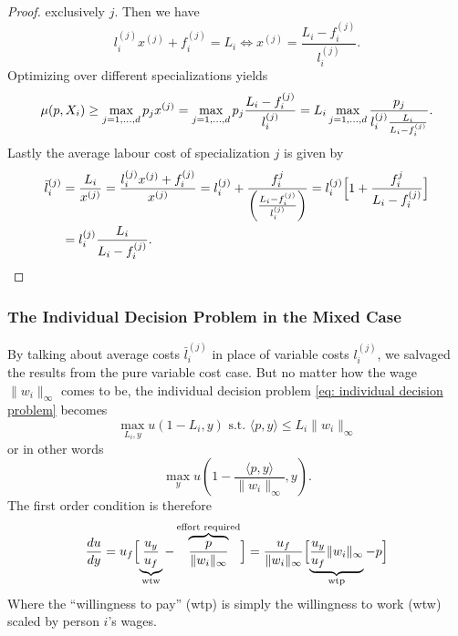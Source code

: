 \begin{proof}
	exclusively \(j\). Then we have
	\[
		l_i^{(j)} x^{(j)} + f_i^{(j)} = L_i \iff x^{(j)}
		= \frac{L_i-f_i^{(j)}}{l_i^{(j)}}.
	\]
	Optimizing over different specializations yields
	\[
		\mu(p, X_i) \ge \max_{j=1,\dots,d} p_j x^{(j)}
		= \max_{j=1,\dots,d}
		p_j \frac{L_i - f_i^{(j)}}{l_i^{(j)}}
		= L_i\max_{j=1,\dots,d}
		\frac{p_j}{l_i^{(j)}\frac{L_i}{L_i - f_i^{(j)}}}.
	\]
	Lastly the average labour cost of specialization \(j\) is given by
	\begin{align*}
		\bar{l}_i^{(j)}
		&= \frac{L_i}{x^{(j)}}
		= \frac{l_i^{(j)} x^{(j)} + f_i^{(j)}}{x^{(j)}}
		= l_i^{(j)} + \frac{f_i^{j}}{\left(\frac{L_i-f_i^{(j)}}{l_i^{(j)}}\right)}
		= l_i^{(j)} \Bigl[1 + \frac{f_i^{j}}{L_i-f_i^{(j)}}\Bigr]\\
		&=l_i^{(j)}\frac{L_i}{L_i - f_i^{(j)}}.
		\qedhere
	\end{align*}
\end{proof}

\subsubsection{The Individual Decision Problem in the Mixed Case}

By talking about average costs \(\bar{l}_i^{(j)}\) in place of variable costs
\(l_i^{(j)}\), we salvaged the results from the pure variable
cost case. But no matter how the wage \(\|w_i\|_\infty\) comes to be, the
individual decision problem \eqref{eq: individual decision problem} becomes
\[
	\max_{L_i, y} u(1-L_i, y) \text{ s.t. } \langle p, y\rangle \le L_i \|w_i\|_\infty
\]
or in other words
\[
	\max_{y} u\left(1- \frac{\langle p, y\rangle}{\|w_i\|_\infty}, y\right).
\]
The first order condition is therefore
\[
	\frac{du}{dy} 
	= u_f\Bigl[
		\underbrace{\frac{u_y}{u_f}}_{\text{wtw}}
		- \overbrace{\frac{p}{\|w_i\|_\infty}}^{\text{effort required}}
	\Bigr]
	= \frac{u_f}{\|w_i\|_\infty}\Bigl[
		\underbrace{\frac{u_y}{u_f}\|w_i\|_\infty}_{\text{wtp}}
		- p
	\Bigr]
\]
Where the ``willingness to pay'' (wtp) is simply the willingness to work
(wtw) scaled by person \(i\)'s wages.

